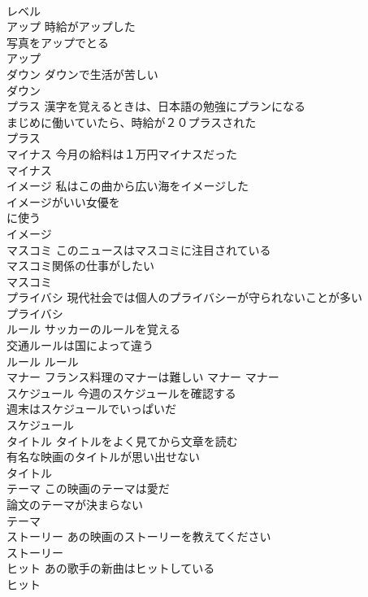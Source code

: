 \documentclass[8pt]{extreport}
\begin{document}
\begin{CJK}{UTF8}{min}
\\	レベル						
\\	アップ	時給がアップした 
\\	写真をアップでとる 
\\	アップ						
\\	ダウン	ダウンで生活が苦しい 
\\	ダウン						
\\	プラス	漢字を覚えるときは、日本語の勉強にプランになる 
\\	まじめに働いていたら、時給が２０プラスされた 
\\	プラス						
\\	マイナス	今月の給料は１万円マイナスだった 
\\	マイナス						
\\	イメージ	私はこの曲から広い海をイメージした 
\\	イメージがいい女優を
\\	に使う 
\\	イメージ						
\\	マスコミ	このニュースはマスコミに注目されている 
\\	マスコミ関係の仕事がしたい 
\\	マスコミ			
\\	プライバシ	現代社会では個人のプライバシーが守られないことが多い 
\\	プライバシ			
\\	ルール	サッカーのルールを覚える 
\\	交通ルールは国によって違う 
\\	ルール			ルール 
\\	マナー	フランス料理のマナーは難しい	マナー			マナー 
\\	スケジュール	今週のスケジュールを確認する 
\\	週末はスケジュールでいっぱいだ 
\\	スケジュール			
\\	タイトル	タイトルをよく見てから文章を読む 
\\	有名な映画のタイトルが思い出せない 
\\	タイトル			
\\	テーマ	この映画のテーマは愛だ 
\\	論文のテーマが決まらない 
\\	テーマ			
\\	ストーリー	あの映画のストーリーを教えてください 
\\	ストーリー			
\\	ヒット	あの歌手の新曲はヒットしている 
\\	ヒット			

\end{CJK}
\end{document}
